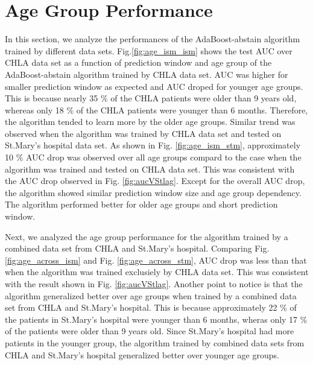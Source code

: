 \documentclass[
   technote
]{phildoc}
\newcommand{\fig}{Fig.}
\begin{document}
\section{Age Group Performance}
\label{sec:age_group_performance} 
In this section, we analyze the performances of the AdaBoost-abstain algorithm trained by different data sets. \fig{}\ref{fig:age_ism_ism} shows the test AUC over CHLA data set as a function of prediction window and age group of the AdaBoost-abstain algorithm trained by CHLA data set. AUC was higher for smaller prediction window as expected and AUC droped for younger age groups. This is because nearly 35 \% of the CHLA patients were older than 9 years old, whereas only 18 \% of the CHLA patients were younger than 6 months. Therefore, the algorithm tended to learn more by the older age groups. Similar trend was observed when the algorithm was trained by CHLA data set and tested on St.Mary's hospital data set. As shown in \fig{} \ref{fig:age_ism_stm}, approximately 10 \% AUC drop was observed over all age groups compard to the case when the algorithm was trained and tested on CHLA data set. This was consistent with the AUC drop observed in \fig{} \ref{fig:aucVStlag}. Except for the overall AUC drop, the algorithm showed similar prediction window size and age group dependency. The algorithm performed better for older age groups and short prediction window.

Next, we analyzed the age group performance for the algorithm trained by a combined data set from CHLA and St.Mary's hospital. Comparing \fig{} \ref{fig:age_across_ism}  and \fig{} \ref{fig:age_across_stm}, AUC drop was less than that when the algorithm was trained exclusiely by CHLA data set. This was consistent with the result shown in \fig{} \ref{fig:aucVStlag}. Another point to notice is that the algorithm generalized better over age groups when trained by a combined data set from CHLA and St.Mary's hospital. This is because approximately 22 \% of the patients in St.Mary's hospital were younger than 6 months, wheras only 17 \% of the patients were older than 9 years old. Since St.Mary's hospital had more patients in the younger group, the algorithm trained by combined data sets from CHLA and St.Mary's hospital generalized better over younger age groups.
\end{document}
